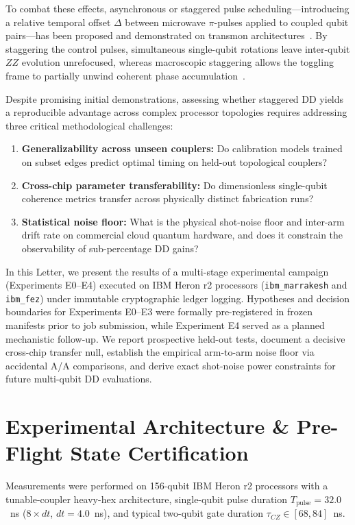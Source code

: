 \documentclass[aps,prl,twocolumn,amsmath,amssymb,superscriptaddress,floatfix]{revtex4-2}
\begin{document}
To combat these effects, asynchronous or staggered pulse scheduling---introducing a relative temporal offset $\Delta$ between microwave $\pi$-pulses applied to coupled qubit pairs---has been proposed and demonstrated on transmon architectures~\cite{Niu2024, Tripathi2022}. By staggering the control pulses, simultaneous single-qubit rotations leave inter-qubit $ZZ$ evolution unrefocused, whereas macroscopic staggering allows the toggling frame to partially unwind coherent phase accumulation~\cite{Niu2024}. 

Despite promising initial demonstrations, assessing whether staggered DD yields a reproducible advantage across complex processor topologies requires addressing three critical methodological challenges:
\begin{enumerate}
    \item \textbf{Generalizability across unseen couplers:} Do calibration models trained on subset edges predict optimal timing on held-out topological couplers?
    \item \textbf{Cross-chip parameter transferability:} Do dimensionless single-qubit coherence metrics transfer across physically distinct fabrication runs?
    \item \textbf{Statistical noise floor:} What is the physical shot-noise floor and inter-arm drift rate on commercial cloud quantum hardware, and does it constrain the observability of sub-percentage DD gains?
\end{enumerate}

In this Letter, we present the results of a multi-stage experimental campaign (Experiments E0--E4) executed on IBM Heron r2 processors (\texttt{ibm\_marrakesh} and \texttt{ibm\_fez}) under immutable cryptographic ledger logging. Hypotheses and decision boundaries for Experiments E0--E3 were formally pre-registered in frozen manifests prior to job submission, while Experiment E4 served as a planned mechanistic follow-up. We report prospective held-out tests, document a decisive cross-chip transfer null, establish the empirical arm-to-arm noise floor via accidental A/A comparisons, and derive exact shot-noise power constraints for future multi-qubit DD evaluations.

\section{Experimental Architecture \& Pre-Flight State Certification}
Measurements were performed on 156-qubit IBM Heron r2 processors with a tunable-coupler heavy-hex architecture, single-qubit pulse duration $T_{\text{pulse}} = 32.0$~ns ($8\times dt$, $dt = 4.0$~ns), and typical two-qubit gate duration $\tau_{CZ} \in [68, 84]$~ns. 
\end{document}
